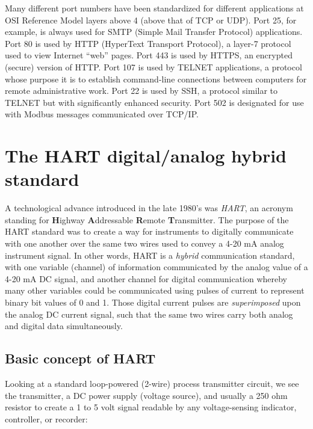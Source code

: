 Many different port numbers have been standardized for different applications at OSI Reference Model layers above 4 (above that of TCP or UDP).  Port 25, for example, is always used for SMTP (Simple Mail Transfer Protocol) applications.  Port 80 is used by HTTP (HyperText Transport Protocol), a layer-7 protocol used to view Internet ``web'' pages.  Port 443 is used by HTTPS, an encrypted (secure) version of HTTP.  Port 107 is used by TELNET applications, a protocol whose purpose it is to establish command-line connections between computers for remote administrative work.  Port 22 is used by SSH, a protocol similar to TELNET but with significantly enhanced security.  Port 502 is designated for use with Modbus messages communicated over TCP/IP.              









\filbreak
\section{The HART digital/analog hybrid standard}

A technological advance introduced in the late 1980's was \textit{HART}, an acronym standing for \textbf{H}ighway \textbf{A}ddressable \textbf{R}emote \textbf{T}ransmitter.  The purpose of the HART standard was to create a way for instruments to digitally communicate with one another over the same two wires used to convey a 4-20 mA analog instrument signal.  In other words, HART is a \textit{hybrid} communication standard, with one variable (channel) of information communicated by the analog value of a 4-20 mA DC signal, and another channel for digital communication whereby many other variables could be communicated using pulses of current to represent binary bit values of 0 and 1.  Those digital current pulses are \textit{superimposed} upon the analog DC current signal, such that the same two wires carry both analog and digital data simultaneously.  




\filbreak
\subsection{Basic concept of HART}

Looking at a standard loop-powered (2-wire) process transmitter circuit, we see the transmitter, a DC power supply (voltage source), and usually a 250 ohm resistor to create a 1 to 5 volt signal readable by any voltage-sensing indicator, controller, or recorder:

